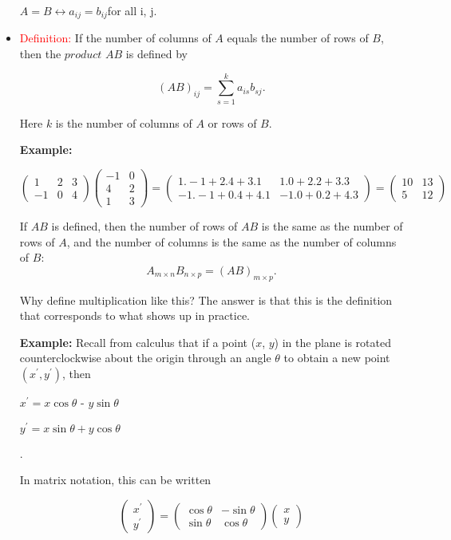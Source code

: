\documentclass{book}
\begin{document}
\begin{itemize}
		\begin{center}		$A = B \leftrightarrow a_{ij} = b_{ij}$for all i, j.\end{center}
		\item \textcolor{red}{Definition:} If the number of columns of $A$ equals the number of rows of $B$, then the $product$ $AB$ is defined by

			$$ (AB)_{ij} = \sum\limits_{s=1}^k a_{is}b_{sj}.$$

			Here $k$ is the number of columns of $A$ or rows of $B$.	

			\textbf{Example:}

			$$\begin{pmatrix}1 & 2 & 3 \\
				-1 & 0 & 4\end{pmatrix} \begin{pmatrix} -1 & 0 \\
			4 & 2 \\
				1 & 3\end{pmatrix} = \begin{pmatrix} 1.-1+2.4+3.1 & 1.0+2.2+3.3 \\
-1.-1+0.4+4.1 & -1.0+0.2+4.3\end{pmatrix} = \begin{pmatrix} 10 & 13 \\
			5 & 12\end{pmatrix} $$

If $AB$ is defined, then the number of rows of $AB$ is the same as the number of rows of $A$, and the number of columns is the same as the number of columns of $B$:
		$$ A_{m×n} B_{n \times p} = (AB)_{m \times p}. $$

Why define multiplication like this? The answer is that this is the definition that corresponds to what shows up in practice.

		\textbf{Example:} Recall from calculus that if a point ($x$, $y$) in the plane is rotated counterclockwise about the origin through an angle $\theta$ to obtain a new point $(x^\prime ,y^\prime)$, then \\
		\begin{center}	$ x^\prime = x \cos\theta$ - $y \sin\theta$ \end{center} 
			\begin{center}$y^\prime = x \sin\theta + y \cos\theta$ \end{center}. 

In matrix notation, this can be written

		$$ \begin{pmatrix}x^\prime \\
			y^\prime \end{pmatrix}	 = \begin{pmatrix} \cos\theta & -\sin\theta \\
				\sin\theta & \cos\theta \end{pmatrix} \begin{pmatrix} x \\ y \end{pmatrix} $$



\end{itemize}
\end{document}
